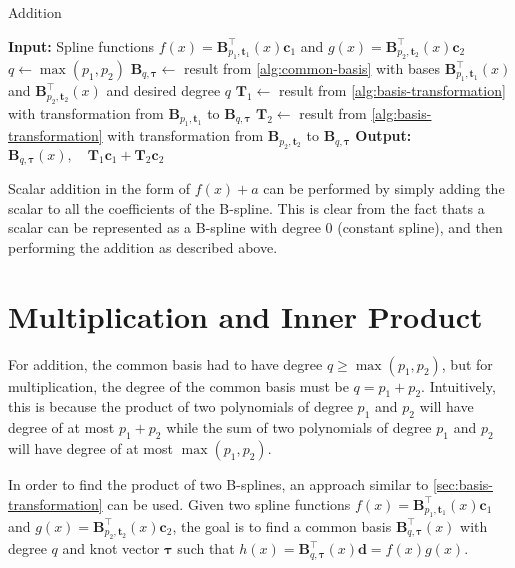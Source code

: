 \begin{algorithm}
    \caption{Addition}\label{alg:addition}
    \begin{algorithmic}[1]
        \State \textbf{Input:} Spline functions $f(x) = \mathbf{B}_{p_1, \mathbf{t}_1}^{\top}(x) \mathbf{c}_1$ and $g(x) = \mathbf{B}_{p_2, \mathbf{t}_2}^{\top}(x) \mathbf{c}_2$
        \State $q \gets \max(p_1, p_2)$
        \State $\mathbf B_{q, \boldsymbol{\tau}} \gets $ result from \cref{alg:common-basis} with bases $\mathbf{B}_{p_1, \mathbf{t}_1}^{\top}(x)$ and $\mathbf{B}_{p_2, \mathbf{t}_2}^{\top}(x)$ and desired degree $q$
        \State $\mathbf T_1 \gets $ result from \cref{alg:basis-transformation} with transformation from $\mathbf B_{p_1, \mathbf{t}_1}$ to $\mathbf B_{q, \boldsymbol{\tau}}$
        \State $\mathbf T_2 \gets $ result from \cref{alg:basis-transformation} with transformation from $\mathbf B_{p_2, \mathbf{t}_2}$ to $\mathbf B_{q, \boldsymbol{\tau}}$
        \State \textbf{Output:} $\mathbf B_{q, \boldsymbol{\tau}}(x), \quad\mathbf T_1 \mathbf c_1 + \mathbf T_2 \mathbf c_2$
    \end{algorithmic}
\end{algorithm}

Scalar addition in the form of $f(x) + a$ can be performed by simply adding the scalar to all the coefficients of the B-spline. This is clear from the fact thats a scalar can be represented as a B-spline with degree $0$ (constant spline), and then performing the addition as described above. 

\section{Multiplication and Inner Product}

For addition, the common basis had to have degree $q \geq \max(p_1, p_2)$, but for multiplication, the degree of the common basis must be $q = p_1 + p_2$. Intuitively, this is because the product of two polynomials of degree $p_1$ and $p_2$ will have degree of at most $p_1 + p_2$ while the sum of two polynomials of degree $p_1$ and $p_2$ will have degree of at most $\max(p_1, p_2)$.

In order to find the product of two B-splines, an approach similar to \cref{sec:basis-transformation} can be used. Given two spline functions $f(x) = \mathbf{B}_{p_1, \mathbf{t}_1}^{\top}(x) \mathbf{c}_1$ and $g(x) = \mathbf{B}_{p_2, \mathbf{t}_2}^{\top}(x) \mathbf{c}_2$, the goal is to find a common basis $\mathbf{B}_{q, \boldsymbol{\tau}}^{\top}(x)$ with degree $q$ and knot vector $\boldsymbol{\tau}$ such that $h(x) = \mathbf{B}_{q, \boldsymbol{\tau}}^{\top}(x) \mathbf{d} = f(x)  g(x)$.

